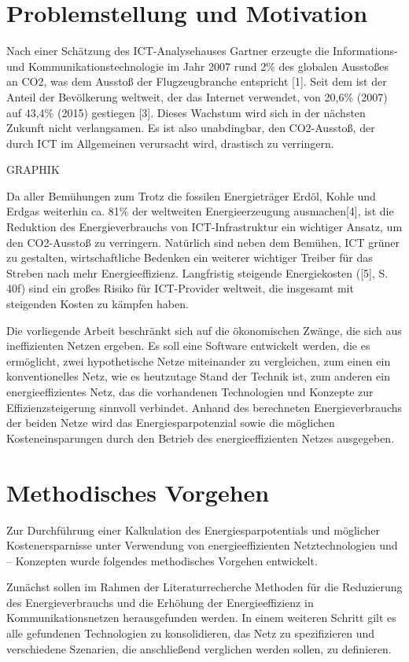 \documentclass[12pt,titlepage]{article}
\begin{document}
\section{Problemstellung und Motivation}
Nach einer Schätzung des ICT-Analysehauses Gartner erzeugte die Informations- und Kommunikationstechnologie im Jahr 2007 rund 2\% des globalen Ausstoßes an CO2, was dem Ausstoß der Flugzeugbranche entspricht [1]. Seit dem ist der Anteil der Bevölkerung weltweit, der das Internet verwendet, von 20,6\% (2007) auf 43,4\% (2015) gestiegen [3]. Dieses Wachstum wird sich in der nächsten Zukunft nicht verlangsamen. Es ist also unabdingbar, den CO2-Ausstoß, der durch ICT im Allgemeinen verursacht wird, drastisch zu verringern.

GRAPHIK

Da aller Bemühungen zum Trotz die fossilen Energieträger Erdöl, Kohle und Erdgas weiterhin ca. 81\% der weltweiten Energieerzeugung ausmachen[4], ist die Reduktion des Energieverbrauchs von ICT-Infrastruktur ein wichtiger Ansatz, um den CO2-Ausstoß zu verringern. Natürlich sind neben dem Bemühen, ICT grüner zu gestalten, wirtschaftliche Bedenken ein weiterer wichtiger Treiber für das Streben nach mehr Energieeffizienz. Langfristig steigende Energiekosten ([5], S. 40f) sind ein großes Risiko für ICT-Provider weltweit, die insgesamt mit steigenden Kosten zu kämpfen haben.
 
Die vorliegende Arbeit beschränkt sich auf die ökonomischen Zwänge, die sich aus ineffizienten Netzen ergeben. Es soll eine Software entwickelt werden, die es ermöglicht, zwei hypothetische Netze miteinander zu vergleichen, zum einen ein konventionelles Netz, wie es heutzutage Stand der Technik ist, zum anderen ein energieeffizientes Netz, das die vorhandenen Technologien und Konzepte zur Effizienzsteigerung sinnvoll verbindet. Anhand des berechneten Energieverbrauchs der beiden Netze wird das Energiesparpotenzial sowie die möglichen Kosteneinsparungen durch den Betrieb des energieeffizienten Netzes ausgegeben.


\section{Methodisches Vorgehen}
Zur Durchführung einer Kalkulation des Energiesparpotentials und möglicher Kostenersparnisse unter Verwendung von energieeffizienten Netztechnologien und – Konzepten wurde folgendes methodisches Vorgehen entwickelt. 
 
Zunächst sollen im Rahmen der Literaturrecherche Methoden für die Reduzierung des Energieverbrauchs und die Erhöhung der Energieeffizienz in Kommunikationsnetzen herausgefunden werden. In einem weiteren Schritt gilt es alle gefundenen Technologien zu konsolidieren, das Netz zu spezifizieren und verschiedene Szenarien, die anschließend verglichen werden sollen, zu definieren. 
 
\end{document}
